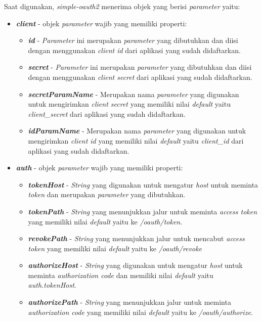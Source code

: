 Saat digunakan, \textit{simple-oauth2} menerima objek yang berisi \textit{parameter} yaitu: 
\begin{itemize}
    \item \textbf{\textit{client}} - objek \textit{parameter} wajib yang memiliki properti: 
    \begin{itemize}
        \item \textbf{\textit{id}} - \textit{Parameter} ini merupakan \textit{parameter} yang dibutuhkan dan diisi dengan menggunakan \textit{client id} dari aplikasi yang sudah didaftarkan. 
        \item \textbf{\textit{secret}} - \textit{Parameter} ini merupakan \textit{parameter} yang dibutuhkan dan diisi dengan menggunakan \textit{client secret} dari aplikasi yang sudah didaftarkan. 
        \item \textbf{\textit{secretParamName}} - Merupakan nama \textit{parameter} yang digunakan untuk mengirimkan \textit{client secret} yang memiliki nilai \textit{default} yaitu \textit{client\_secret} dari aplikasi yang sudah didaftarkan. 
        \item \textbf{\textit{idParamName}} - Merupakan nama \textit{parameter} yang digunakan untuk mengirimkan \textit{client id} yang memiliki nilai \textit{default} yaitu \textit{client\_id} dari aplikasi yang sudah didaftarkan. 
    \end{itemize}
    \item \textbf{\textit{auth}} - objek \textit{parameter} wajib yang memiliki properti: 
    \begin{itemize}
        \item \textbf{\textit{tokenHost}} - \textit{String} yang digunakan untuk mengatur \textit{host} untuk meminta \textit{token} dan merupakan \textit{parameter} yang dibutuhkan.  
        \item \textbf{\textit{tokenPath}} - \textit{String} yang menunjukkan jalur untuk meminta \textit{access token} yang memiliki nilai \textit{default} yaitu ke \textit{/oauth/token}. 
        \item \textbf{\textit{revokePath}} - \textit{String} yang menunjukkan jalur untuk mencabut \textit{access token} yang memiliki nilai \textit{default} yaitu ke \textit{/oauth/revoke}
        \item \textbf{\textit{authorizeHost}} - \textit{String} yang digunakan untuk mengatur \textit{host} untuk meminta \textit{authorization code} dan memiliki nilai \textit{default} yaitu \textit{auth.tokenHost}. 
        \item \textbf{\textit{authorizePath}} - \textit{String} yang menunjukkan jalur untuk meminta \textit{authorization code} yang memiliki nilai \textit{default} yaitu ke \textit{/oauth/authorize}. 

\end{itemize}
\end{itemize}
